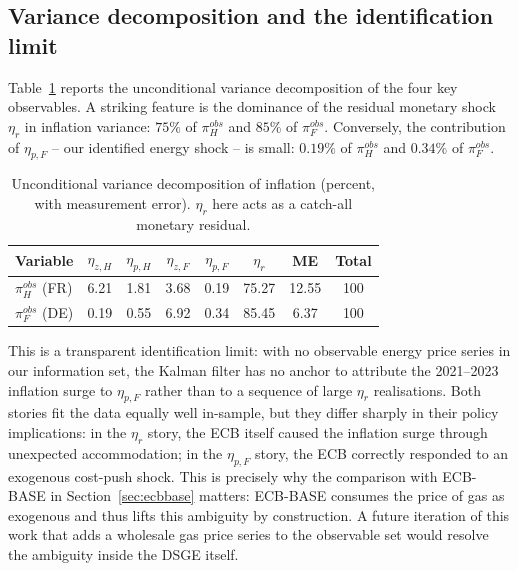 \documentclass[11pt,a4paper]{article}
\begin{document}
\subsection{Variance decomposition and the identification limit}
Table~\ref{tab:vardec} reports the unconditional variance
decomposition of the four key observables. A striking feature is the
dominance of the residual monetary shock $\eta_r$ in inflation
variance: $75\%$ of $\pi^{obs}_H$ and $85\%$ of $\pi^{obs}_F$.
Conversely, the contribution of $\eta_{p,F}$ -- our identified
energy shock -- is small: $0.19\%$ of $\pi^{obs}_H$ and $0.34\%$ of
$\pi^{obs}_F$.

\begin{table}[h!]
\centering\small
\caption{Unconditional variance decomposition of inflation
  (percent, with measurement error). $\eta_r$ here acts as a
  catch-all monetary residual.}
\label{tab:vardec}
\begin{tabular}{l c c c c c c c}
\toprule
Variable & $\eta_{z,H}$ & $\eta_{p,H}$ & $\eta_{z,F}$ & $\eta_{p,F}$ & $\eta_r$ & ME & Total \\
\midrule
$\pi^{obs}_H$ (FR) & 6.21 & 1.81 & 3.68 & 0.19 & 75.27 & 12.55 & 100 \\
$\pi^{obs}_F$ (DE) & 0.19 & 0.55 & 6.92 & 0.34 & 85.45 & 6.37  & 100 \\
\bottomrule
\end{tabular}
\end{table}

This is a transparent identification limit: with no observable
energy price series in our information set, the Kalman filter has
no anchor to attribute the 2021--2023 inflation surge to
$\eta_{p,F}$ rather than to a sequence of large $\eta_r$
realisations. Both stories fit the data equally well in-sample,
but they differ sharply in their policy implications: in the
$\eta_r$ story, the ECB itself caused the inflation surge through
unexpected accommodation; in the $\eta_{p,F}$ story, the ECB
correctly responded to an exogenous cost-push shock. This is
precisely why the comparison with ECB-BASE in
Section~\ref{sec:ecbbase} matters: ECB-BASE consumes the price of
gas as exogenous and thus lifts this ambiguity by construction.
A future iteration of this work that adds a wholesale gas price
series to the observable set would resolve the ambiguity inside the
DSGE itself.
\end{document}
